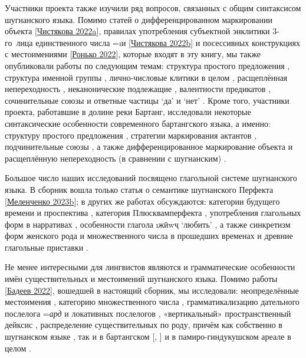 Участники проекта также изучили ряд вопросов, связанных с общим синтаксисом шугнанского языка. Помимо статей о
дифференцированном маркировании объекта [\b{\hyperref[chapter-chist-dom]{Чистякова 2022a}}],
правилах употребления субъектной энклитики 3-го~лица единственного числа =\i{и} [\b{\hyperref[chapter-chist-clitic]{Чистякова 2022b}}]
и посессивных конструкциях с местоимениями [\b{\hyperref[chapter-ronko-poss]{Ронько 2022}}],
которые входят в эту книгу, мы также опубликовали работы по следующим темам:
структура простого предложения \parencite{chistiakova2022_word_order},
структура именной группы \parencite{sarkisov2018},
лично-числовые клитики в целом \parencite{chistiakova2023_wackernagel},
расщеплённая непереходность \parencite{chistiakova2023},
неканонические подлежащие \parencite{sergienko2023},
валентности предикатов \parencite{chistiakova_ryzhova2023},
сочинительные союзы \parencite{padalka_melenchenko2024} и
ответные частицы ‘да’ и ‘нет’ \parencite{padalka_ryzhova2024}.
Кроме того, участники проекта, работавшие в долине реки Бартанг, исследовали некоторые синтаксические особенности современного бартангского языка, а именно:
структуру простого предложения \parencite{belyaev2024_clause},
стратегии маркирования актантов \parencite{sergienko2025_alignment},
подчинительные союзы \parencites{belyaev2025_subd}{belyaev2025_conj}{belyaev2025_constr},
а также дифференцированное маркирование объекта \parencite{belyaev2024_dom}
и расщеплённую непереходность (в сравнении с шугнанским) \parencite{chistiakova2025}.

Большое число наших исследований посвящено глагольной системе шугнанского языка. В сборник вошла только статья о семантике шугнанского Перфекта [\b{\hyperref[chapter-melen-evid]{Меленченко 2023b}}]; в других же работах обсуждаются:
категории будущего времени и проспектива \parencite{grebneva2023_thesis},
категория Плюсквамперфекта \parencite{melenchenko2025_pluperfect},
употребления глагольных форм в нарративах \parencite{melenchenko2025_diploma},
особенности глагола \i{жӣwҷ} ‘любить’ \parencite{melenchenko2024_love},
а также синкретизм форм женского рода и множественного числа в прошедших временах \parencite{sergienko_kasenov2023}
и древние глагольные приставки \parencite{armand2024}.

Не менее интересными для лингвистов являются и грамматические особенности имён существительных и местоимений шугнанского языка. Помимо работы [\b{\hyperref[chapter-badeev-demon]{Бадеев 2022}}], вошедшей в настоящий сборник, мы исследовали:
неопределённые местоимения \parencite{badeev_sergienko2023},
категорию множественного числа \parencites{butolin2022}{timofeeva2023},
грамматикализацию дательного послелога =\textit{ард} \parencite{padalka_etal2026} и локативных послелогов \parencite{novokshanov2025},
«вертикальный» пространственный дейксис \parencite{yakubson2023},
распределение существительных по роду, причём как собственно в шугнанском языке \parencite{badeev2022_gender},
так и в бартангском [\cite{badeev2023_bartangi}, \cite*{badeev2025_gender}]
и в памиро-гиндукушском ареале в целом \parencite{badeev2023_hindukush}.

